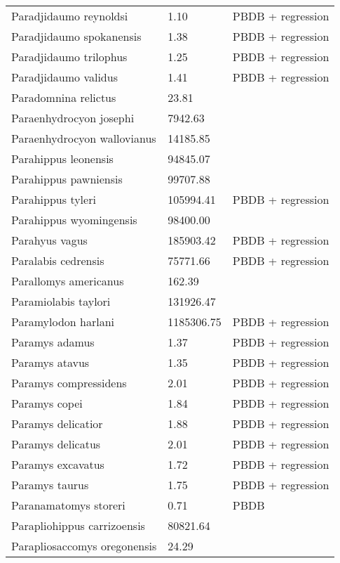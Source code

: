 \documentclass{article}
\begin{document}
\begin{center}
\begin{longtable}{p{} p{} p{}}
    Paradjidaumo reynoldsi & 1.10 & PBDB + regression \\ 
    Paradjidaumo spokanensis & 1.38 & PBDB + regression \\ 
    Paradjidaumo trilophus & 1.25 & PBDB + regression \\ 
    Paradjidaumo validus & 1.41 & PBDB + regression \\ 
    Paradomnina relictus & 23.81 & \cite{Tomiya2013} \\ 
    Paraenhydrocyon josephi & 7942.63 & \cite{Tomiya2013} \\ 
    Paraenhydrocyon wallovianus & 14185.85 & \cite{Tomiya2013} \\ 
    Parahippus leonensis & 94845.07 & \cite{Tomiya2013} \\ 
    Parahippus pawniensis & 99707.88 & \cite{Tomiya2013} \\ 
    Parahippus tyleri & 105994.41 & PBDB + regression \\ 
    Parahippus wyomingensis & 98400.00 & \cite{MacFadden1986} \\ 
    Parahyus vagus & 185903.42 & PBDB + regression \\ 
    Paralabis cedrensis & 75771.66 & PBDB + regression \\ 
    Parallomys americanus & 162.39 & \cite{Tomiya2013} \\ 
    Paramiolabis taylori & 131926.47 & \cite{Tomiya2013} \\ 
    Paramylodon harlani & 1185306.75 & PBDB + regression \\ 
    Paramys adamus & 1.37 & PBDB + regression \\ 
    Paramys atavus & 1.35 & PBDB + regression \\ 
    Paramys compressidens & 2.01 & PBDB + regression \\ 
    Paramys copei & 1.84 & PBDB + regression \\ 
    Paramys delicatior & 1.88 & PBDB + regression \\ 
    Paramys delicatus & 2.01 & PBDB + regression \\ 
    Paramys excavatus & 1.72 & PBDB + regression \\ 
    Paramys taurus & 1.75 & PBDB + regression \\ 
    Paranamatomys storeri & 0.71 & PBDB \\ 
    Parapliohippus carrizoensis & 80821.64 & \cite{Tomiya2013} \\ 
    Parapliosaccomys oregonensis & 24.29 & \cite{Tomiya2013} \\ 

\end{longtable}
\end{center}
\end{document}
